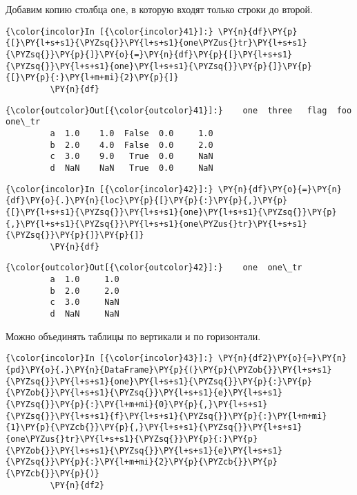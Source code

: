     Добавим копию столбца \texttt{one}, в которую входят только строки до
второй.

    \begin{Verbatim}[commandchars=\\\{\}]
{\color{incolor}In [{\color{incolor}41}]:} \PY{n}{df}\PY{p}{[}\PY{l+s+s1}{\PYZsq{}}\PY{l+s+s1}{one\PYZus{}tr}\PY{l+s+s1}{\PYZsq{}}\PY{p}{]}\PY{o}{=}\PY{n}{df}\PY{p}{[}\PY{l+s+s1}{\PYZsq{}}\PY{l+s+s1}{one}\PY{l+s+s1}{\PYZsq{}}\PY{p}{]}\PY{p}{[}\PY{p}{:}\PY{l+m+mi}{2}\PY{p}{]}
         \PY{n}{df}
\end{Verbatim}

            \begin{Verbatim}[commandchars=\\\{\}]
{\color{outcolor}Out[{\color{outcolor}41}]:}    one  three   flag  foo  one\_tr
         a  1.0    1.0  False  0.0     1.0
         b  2.0    4.0  False  0.0     2.0
         c  3.0    9.0   True  0.0     NaN
         d  NaN    NaN   True  0.0     NaN
\end{Verbatim}
        
    \begin{Verbatim}[commandchars=\\\{\}]
{\color{incolor}In [{\color{incolor}42}]:} \PY{n}{df}\PY{o}{=}\PY{n}{df}\PY{o}{.}\PY{n}{loc}\PY{p}{[}\PY{p}{:}\PY{p}{,}\PY{p}{[}\PY{l+s+s1}{\PYZsq{}}\PY{l+s+s1}{one}\PY{l+s+s1}{\PYZsq{}}\PY{p}{,}\PY{l+s+s1}{\PYZsq{}}\PY{l+s+s1}{one\PYZus{}tr}\PY{l+s+s1}{\PYZsq{}}\PY{p}{]}\PY{p}{]}
         \PY{n}{df}
\end{Verbatim}

            \begin{Verbatim}[commandchars=\\\{\}]
{\color{outcolor}Out[{\color{outcolor}42}]:}    one  one\_tr
         a  1.0     1.0
         b  2.0     2.0
         c  3.0     NaN
         d  NaN     NaN
\end{Verbatim}
        
    Можно объединять таблицы по вертикали и по горизонтали.

    \begin{Verbatim}[commandchars=\\\{\}]
{\color{incolor}In [{\color{incolor}43}]:} \PY{n}{df2}\PY{o}{=}\PY{n}{pd}\PY{o}{.}\PY{n}{DataFrame}\PY{p}{(}\PY{p}{\PYZob{}}\PY{l+s+s1}{\PYZsq{}}\PY{l+s+s1}{one}\PY{l+s+s1}{\PYZsq{}}\PY{p}{:}\PY{p}{\PYZob{}}\PY{l+s+s1}{\PYZsq{}}\PY{l+s+s1}{e}\PY{l+s+s1}{\PYZsq{}}\PY{p}{:}\PY{l+m+mi}{0}\PY{p}{,}\PY{l+s+s1}{\PYZsq{}}\PY{l+s+s1}{f}\PY{l+s+s1}{\PYZsq{}}\PY{p}{:}\PY{l+m+mi}{1}\PY{p}{\PYZcb{}}\PY{p}{,}\PY{l+s+s1}{\PYZsq{}}\PY{l+s+s1}{one\PYZus{}tr}\PY{l+s+s1}{\PYZsq{}}\PY{p}{:}\PY{p}{\PYZob{}}\PY{l+s+s1}{\PYZsq{}}\PY{l+s+s1}{e}\PY{l+s+s1}{\PYZsq{}}\PY{p}{:}\PY{l+m+mi}{2}\PY{p}{\PYZcb{}}\PY{p}{\PYZcb{}}\PY{p}{)}
         \PY{n}{df2}
\end{Verbatim}

